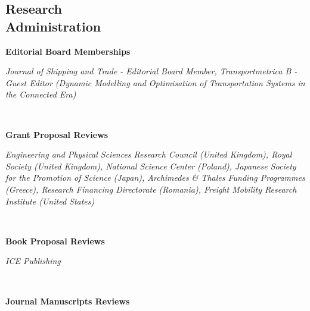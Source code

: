 \documentclass[margin]{res}
\begin{document}
\begin{resume}
\section{\sc Research\\ Administration}
\vspace{0.05in}
	\begin{minipage}{\textwidth}
	{\bf Editorial Board Memberships} \\
	\vspace{0.1in}
	\begin{minipage}{\textwidth}
	\setlength{\leftskip}{0.2in}
	\textit{
Journal of Shipping and Trade - Editorial Board Member, Transportmetrica B - Guest Editor (Dynamic Modelling and Optimisation of Transportation Systems in the Connected Era)	}
	\end{minipage}
	\end{minipage}
	\\
	\begin{minipage}{\textwidth}
	{\bf Grant Proposal Reviews} \\
	\vspace{0.1in}
	\begin{minipage}{\textwidth}
	\setlength{\leftskip}{0.2in}
	\textit{
Engineering and Physical Sciences Research Council (United Kingdom), Royal Society (United Kingdom), National Science Center (Poland), Japanese Society for the Promotion of Science (Japan), Archimedes \& Thales Funding Programmes (Greece), Research Financing Directorate (Romania), Freight Mobility Research Institute (United States)	}
	\end{minipage}
	\end{minipage}
	\\
	\begin{minipage}{\textwidth}
	{\bf Book Proposal Reviews} \\
	\vspace{0.1in}
	\begin{minipage}{\textwidth}
	\setlength{\leftskip}{0.2in}
	\textit{
ICE Publishing	}
	\end{minipage}
	\end{minipage}
	\\
	\begin{minipage}{\textwidth}
	{\bf Journal Manuscripts Reviews} \\
	\vspace{0.1in}
	\begin{minipage}{\textwidth}
	\setlength{\leftskip}{0.2in}
	\textit{
}
\end{minipage}
\end{minipage}
\end{resume}
\end{document}
